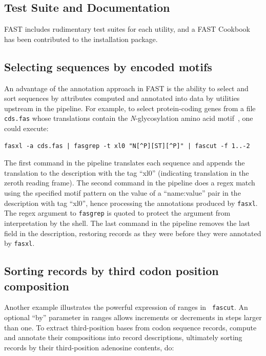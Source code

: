 \documentclass{frontiersSCNS} %
\begin{document}
\subsection{Test Suite and Documentation}
FAST includes rudimentary test suites for each utility, and a FAST
Cookbook has been contributed to the installation package.

\subsection{Selecting sequences by encoded motifs }

An advantage of the annotation approach in FAST is the ability to
select and sort sequences by attributes computed and annotated into
data by utilities upstream in the pipeline. For example, to select
protein-coding genes from a file {\tt cds.fas} whose translations
contain the {\it N}-glycosylation amino acid
motif~\citep{KornfieldKornfield85}, one could execute:

\begin{verbatim}
fasxl -a cds.fas | fasgrep -t xl0 "N[^P][ST][^P]" | fascut -f 1..-2
\end{verbatim}
 
The first command in the pipeline translates each sequence and appends
the translation to the description with the tag ``xl0'' (indicating
translation in the zeroth reading frame). The second command in the
pipeline does a regex match using the specified motif pattern on the
value of a ``name:value'' pair in the description with tag ``xl0'',
hence processing the annotations produced by {\tt fasxl}. The regex
argument to {\tt fasgrep} is quoted to protect the argument from
interpretation by the shell. The last command in the pipeline removes
the last field in the description, restoring records as they were
before they were annotated by {\tt fasxl}.

\subsection{Sorting records by third codon position composition}

Another example illustrates the powerful expression of ranges in {\tt
  fascut}. An optional ``by'' parameter in ranges allows increments or
decrements in steps larger than one. To extract third-position bases
from codon sequence records, compute and annotate their compositions
into record descriptions, ultimately sorting records by
their third-position adenosine contents, do:
\end{document}
